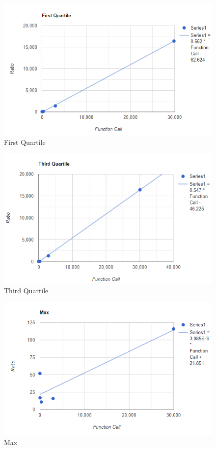 \documentclass[a4paper, 12pt, titlepage]{article}
\begin{document}
    \begin{figure}[H]
	\centering
	\caption{First Quartile}
	\label{fig:First Qaurtile}
	\includegraphics[width=.85\textwidth]{hfd1.PNG} %
\end{figure}

    \begin{figure}[H]
	\centering
	\caption{Third Quartile}
	\label{fig:Third Quartile}
	\includegraphics[width=.85\textwidth]{hfd2.PNG} %
\end{figure}

\newpage

    \begin{figure}[H]
	\centering
	\caption{Max}
	\label{fig:Max}
	\includegraphics[width=.85\textwidth]{hfd3.PNG} %
\end{figure}
\end{document}
